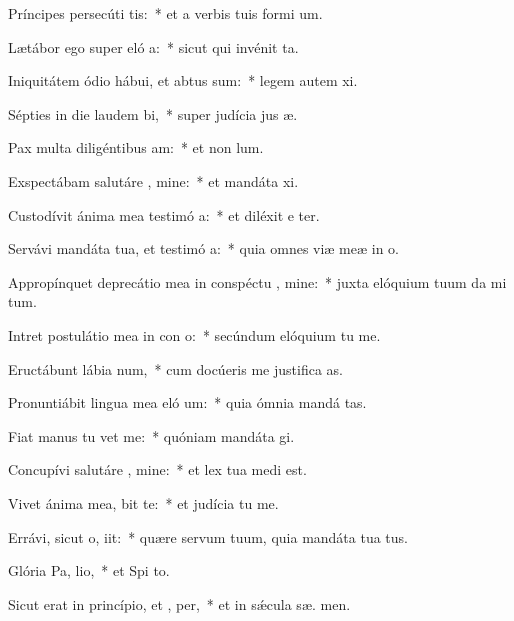 \item Príncipes persecúti   tis:~* et a verbis tuis formi  um.
\item Lætábor ego super eló a:~* sicut qui invénit  ta.
\item Iniquitátem ódio hábui, et abtus sum:~* legem autem  xi.
\item Sépties in die laudem  bi,~* super judícia jus æ.
\item Pax multa diligéntibus  am:~* et non   lum.
\item Exspectábam salutáre , mine:~* et mandáta  xi.
\item Custodívit ánima mea testimó a:~* et diléxit e ter.
\item Servávi mandáta tua, et testimó a:~* quia omnes viæ meæ in  o.
\item Appropínquet deprecátio mea in conspéctu , mine:~* juxta elóquium tuum da mi tum.
\item Intret postulátio mea in con o:~* secúndum elóquium tu  me.
\item Eructábunt lábia  num,~* cum docúeris me justifica as.
\item Pronuntiábit lingua mea eló um:~* quia ómnia mandá  tas.
\item Fiat manus tu  vet me:~* quóniam mandáta  gi.
\item Concupívi salutáre , mine:~* et lex tua medi  est.
\item Vivet ánima mea,  bit te:~* et judícia tu  me.
\item Errávi, sicut o,  iit:~* quære servum tuum, quia mandáta tua   tus.
\item Glória Pa,  lio,~* et Spi to.
\item Sicut erat in princípio, et ,  per,~* et in sǽcula sæ. men.
